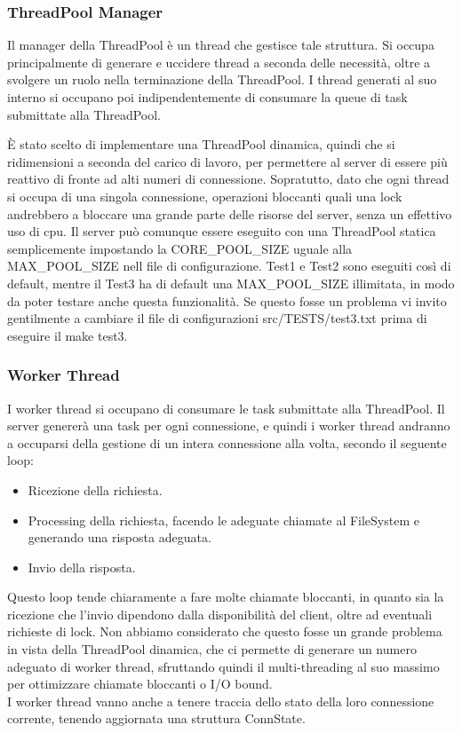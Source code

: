 \documentclass[11pt]{article}
\begin{document}
\begin{flushleft}
\subsubsection{ThreadPool Manager}
Il manager della ThreadPool è un thread che gestisce tale struttura. Si occupa principalmente di generare e uccidere thread a seconda delle necessità, oltre a svolgere un ruolo nella terminazione della ThreadPool. I thread generati al suo interno si occupano poi indipendentemente di consumare la queue di task submittate alla ThreadPool.

È stato scelto di implementare una ThreadPool dinamica, quindi che si ridimensioni a seconda del carico di lavoro, per permettere al server di essere più reattivo di fronte ad alti numeri di connessione.
Sopratutto, dato che ogni thread si occupa di una singola connessione, operazioni bloccanti quali una lock andrebbero a bloccare una grande parte delle risorse del server, senza un effettivo uso di cpu. Il server può comunque essere eseguito con una ThreadPool statica semplicemente impostando la CORE\_POOL\_SIZE uguale alla MAX\_POOL\_SIZE nell file di configurazione. Test1 e Test2 sono eseguiti così di default, mentre il Test3 ha di default una MAX\_POOL\_SIZE illimitata, in modo da poter testare anche questa funzionalità. Se questo fosse un problema vi invito gentilmente a cambiare il file di configurazioni src/TESTS/test3.txt prima di eseguire il make test3.

\subsubsection{Worker Thread}
I worker thread si occupano di consumare le task submittate alla ThreadPool. Il server genererà una task per ogni connessione, e quindi i worker thread andranno a occuparsi della gestione di un intera connessione alla volta, secondo il seguente loop: 
\begin{itemize}

\item Ricezione della richiesta.

\item Processing della richiesta, facendo le adeguate chiamate al FileSystem e generando una risposta adeguata.

\item Invio della risposta.

\end{itemize}

Questo loop tende chiaramente a fare molte chiamate bloccanti, in quanto sia la ricezione che l'invio dipendono dalla disponibilità del client, oltre ad eventuali richieste di lock.
Non abbiamo considerato che questo fosse un grande problema in vista della ThreadPool dinamica, che ci permette di generare un numero adeguato di worker thread, sfruttando quindi il multi-threading al suo massimo per ottimizzare chiamate bloccanti o I/O bound.
\\
I worker thread vanno anche a tenere traccia dello stato della loro connessione corrente, tenendo aggiornata una struttura ConnState.


\end{flushleft}
\end{document}
